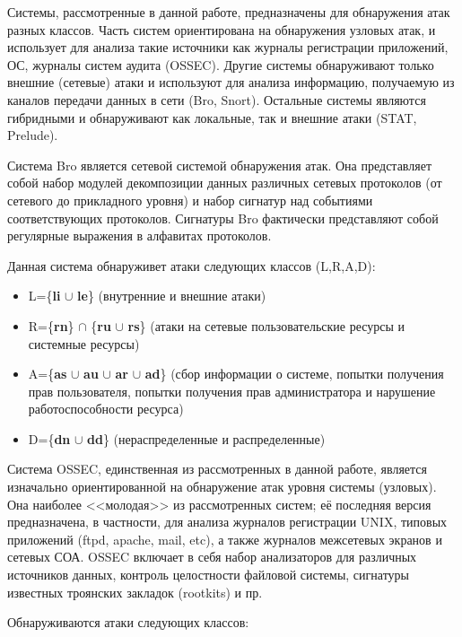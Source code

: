 Системы, рассмотренные в данной работе, предназначены для обнаружения атак
разных классов. Часть систем ориентирована на обнаружения узловых атак, и
использует для анализа такие источники как журналы регистрации приложений, ОС,
журналы систем аудита (OSSEC). Другие системы обнаруживают только внешние
(сетевые) атаки и используют для анализа информацию, получаемую из каналов
передачи данных в сети (Bro, Snort). Остальные системы являются гибридными и
обнаруживают как локальные, так и внешние атаки (STAT, Prelude).

Система Bro является сетевой системой обнаружения атак. Она представляет собой
набор модулей декомпозиции данных различных сетевых протоколов (от сетевого до
прикладного уровня) и набор сигнатур над событиями соответствующих протоколов.
Сигнатуры Bro фактически представляют собой регулярные выражения в алфавитах
протоколов.

Данная система обнаруживет атаки следующих классов (L,R,A,D):

\begin{itemize}

\item L=\{\textbf{li} $\cup$ \textbf{le}\} (внутренние и внешние атаки)
\item R=\{\textbf{rn}\} $\cap$ \{\textbf{ru} $\cup$ \textbf{rs}\} (атаки на сетевые пользовательские ресурсы и системные ресурсы)
\item A=\{\textbf{as} $\cup$ \textbf{au} $\cup$ \textbf{ar} $\cup$ \textbf{ad}\} (сбор информации о системе, попытки получения
прав пользователя, попытки получения прав администратора и нарушение
работоспособности ресурса)
\item D=\{\textbf{dn} $\cup$ \textbf{dd}\} (нераспределенные и распределенные)

\end{itemize}

Система OSSEC, единственная из рассмотренных в данной работе, является
изначально ориентированной на обнаружение атак уровня системы (узловых). Она
наиболее <<молодая>> из рассмотренных систем; её последняя версия предназначена, в
частности, для анализа журналов регистрации UNIX, типовых приложений (ftpd,
apache, mail, etc), а также журналов межсетевых экранов и сетевых СОА. OSSEC
включает в себя набор анализаторов для различных источников данных, контроль
целостности файловой системы, сигнатуры известных троянских закладок (rootkits) и
пр.

Обнаруживаются атаки следующих классов:


